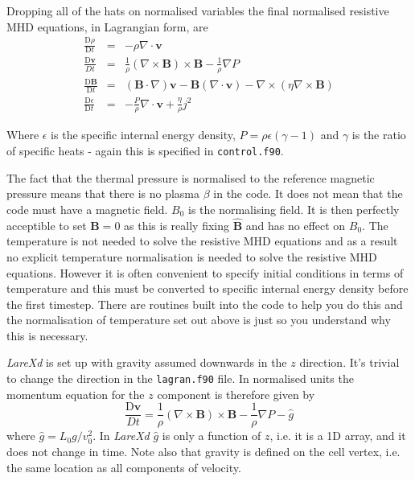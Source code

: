 \documentclass[11pt]{article}
\begin{document}
Dropping all of the hats on normalised variables the final normalised resistive MHD equations, in Lagrangian form, are
\begin{eqnarray}
\frac{\mathrm{D}\rho}{\mathrm{D}t}&=&-\rho \nabla\cdot \mathbf{v}\\
\frac{\mathrm{D}\mathbf{v}}{Dt}&=&\frac{1}{\rho}(\nabla\times\mathbf{B})\times\mathbf{B}
-\frac{1}{\rho}\nabla P \label{velocity_eqn}\\
\frac{\mathrm{D}\mathbf{B}}{\mathrm{D}t}&=&(\mathbf{B}\cdot\nabla)\mathbf{v}-\mathbf{B}
(\nabla\cdot\mathbf{v})-\nabla\times(\eta\nabla\times\mathbf{B})\\
\frac{\mathrm{D}\epsilon}{\mathrm{D}t}&=&-\frac{P}{\rho}\nabla\cdot\mathbf{v}+\frac
{\eta}{\rho}j^{2} \label{energy_eqn}
\end{eqnarray}

Where $\epsilon$ is the specific internal energy density, $P = \rho \epsilon(\gamma - 1)$ and $\gamma$ is the ratio of specific heats - again this is specified in \texttt{control.f90}.

The fact that the thermal pressure is normalised to the reference magnetic pressure means that there is no plasma $\beta$ in the code. It does not mean that the code must have a magnetic field. $B_0$ is the normalising field. It is then perfectly acceptible to set $\mathbf{B}=0$ as this is really fixing $\hat{\mathbf{B}}$ and has no effect on  $B_0$. The temperature is not needed to solve the resistive MHD equations and as a result no explicit temperature normalisation is needed to solve the resistive MHD equations. However it is often convenient to specify initial conditions in terms of temperature and this must be converted to specific internal energy density before the first timestep. There are routines built into the code to help you do this and the normalisation of temperature set out above is just so you understand why this is necessary. 

{\it LareXd} is set up with gravity assumed downwards in the $z$ direction. It's trivial to change the direction in the \texttt{lagran.f90} file. In normalised units the momentum equation for the $z$ component is therefore given by
\begin{displaymath}
 \frac{\mathrm{D}\mathbf{v}}{Dt}=\frac{1}{\rho}(\nabla\times\mathbf{B})\times\mathbf{B}
-\frac{1}{\rho}\nabla P-\hat{g}
\end{displaymath} 
where $\hat{g}=L_0 g / v_0^2$. In {\it LareXd} $\hat{g}$ is only a function of $z$, i.e. it is a 1D array, and it does not change in time. Note also that gravity is defined on the cell vertex, i.e. the same location as all components of velocity.
\end{document}
